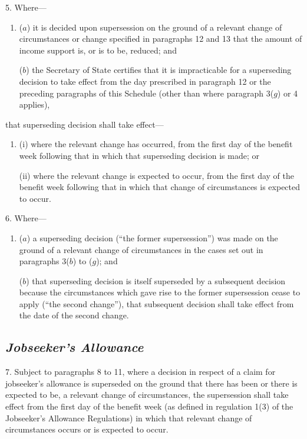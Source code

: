 \documentclass[12pt,a4paper]{article}
\begin{document}
5.  Where—
\begin{enumerate}\item[]
($a$) it is decided upon supersession on the ground of a relevant change of circumstances 
or change specified in paragraphs 12 and 13  %
that the amount of income support is, or is to be, reduced; and

($b$) the Secretary of State certifies that it is impracticable for a superseding decision to take effect from the day prescribed in 
paragraph 12 or  %
the preceding paragraphs of this Schedule (other than where paragraph 3($g$)  or 4 applies),
\end{enumerate}
that superseding decision shall take effect—
\begin{enumerate}\item[]
(i) where the relevant change has occurred, from the first day of the benefit week following that in which that superseding decision is made; or

(ii) where the relevant change is expected to occur, from the first day of the benefit week following that in which that change of circumstances is expected to occur.
\end{enumerate}


\medskip

6.  Where—
\begin{enumerate}\item[]
($a$) a superseding decision (“the former supersession”) was made on the ground of a relevant change of circumstances in the cases set out in paragraphs 3($b$)  to ($g$); and

($b$) that superseding decision is itself superseded by a subsequent decision because the circumstances which gave rise to the former supersession cease to apply (“the second change”), that subsequent decision shall take effect from the date of the second change.
\end{enumerate}

\subsection*{\itshape Jobseeker’s Allowance}

7.  Subject to paragraphs 8 to 11, where a decision in respect of a claim for jobseeker’s allowance is superseded on the ground that there has been or there is expected to be, a relevant change of circumstances, the supersession shall take effect from the first day of the benefit week (as defined in regulation 1(3) of the Jobseeker’s Allowance Regulations) in which that relevant change of circumstances occurs or is expected to occur.
\end{document}
